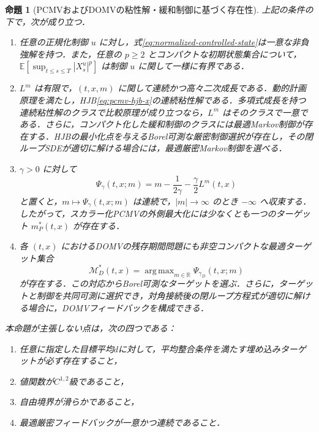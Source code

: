 \documentclass[10pt,a4paper]{article}
\theoremstyle{plain}
\newtheorem{proposition}{命題}
\theoremstyle{definition}
\newcommand{\E}{\mathbb{E}}
\DeclareMathOperator*{\argmax}{arg\,max}
\begin{document}
\begin{proposition}[PCMVおよびDOMVの粘性解・緩和制御に基づく存在性]
\label{prop:weak-existence-pcmv-domv}
上記の条件の下で，次が成り立つ．
\begin{enumerate}[label=(\roman*),leftmargin=2.2em]
 \item 任意の正規化制御 $u$ に対し，式\eqref{eq:normalized-controlled-state}は一意な非負強解を持つ．また，任意の $p\geq2$ とコンパクトな初期状態集合について，$\E[\sup_{t\leq s\leq T}|X_s^u|^p]$ は制御 $u$ に関して一様に有界である．
 \item $L^m$ は有限で，$(t,x,m)$ に関して連続かつ高々二次成長である．動的計画原理を満たし，HJB\eqref{eq:pcmv-hjb-x}の連続粘性解である．多項式成長を持つ連続粘性解のクラスで比較原理が成り立つなら，$L^m$ はそのクラスで一意である．さらに，コンパクト化した緩和制御のクラスには最適Markov制御が存在する．HJBの最小化点を与えるBorel可測な厳密制御選択が存在し，その閉ループSDEが適切に解ける場合には，最適厳密Markov制御を選べる．
 \item $\gamma>0$ に対して
 \begin{equation}
  \Psi_\gamma(t,x;m)
  =m-\frac{1}{2\gamma}-\frac{\gamma}{2}L^m(t,x)
  \label{eq:app-scalarized-envelope}
 \end{equation}
 と置くと，$m\mapsto\Psi_\gamma(t,x;m)$ は連続で，$|m|\to\infty$ のとき $-\infty$ へ収束する．したがって，スカラー化PCMVの外側最大化には少なくとも一つのターゲット $m_P^*(t,x)$ が存在する．
 \item 各 $(t,x)$ におけるDOMVの残存期間問題にも非空コンパクトな最適ターゲット集合
 \[
   \mathcal M_D^*(t,x)=\argmax_{m\in\mathbb R}\Psi_{\gamma_D}(t,x;m)
 \]
 が存在する．この対応からBorel可測なターゲットを選ぶ．さらに，ターゲットと制御を共同可測に選択でき，対角接続後の閉ループ方程式が適切に解ける場合に，DOMVフィードバックを構成できる．
\end{enumerate}
本命題が主張しない点は，次の四つである：
\begin{enumerate}[label=(\alph*),leftmargin=2.2em,noitemsep,topsep=2pt]
 \item 任意に指定した目標平均$d$に対して，平均整合条件を満たす埋め込みターゲットが必ず存在すること，
 \item 値関数が$C^{1,2}$級であること，
 \item 自由境界が滑らかであること，
 \item 最適厳密フィードバックが一意かつ連続であること．
\end{enumerate}
\end{proposition}
\end{document}

